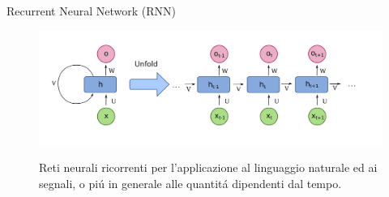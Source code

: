 \documentclass[aspectratio=169]{beamer}
\begin{document}
\begin{frame}{Recurrent Neural Network (RNN)}
    \begin{figure}
        \begin{minipage}{0.7\textwidth}
            \centering
            \includegraphics[width=\textwidth]{architectures/RNN.png}
        \end{minipage}%
        \begin{minipage}{0.3\textwidth}
            \centering
            Reti neurali ricorrenti per l'applicazione al linguaggio naturale ed ai segnali, o pi\'u in generale alle quantit\'a dipendenti dal tempo.
        \end{minipage}
    \end{figure}
\end{frame}
\end{document}

